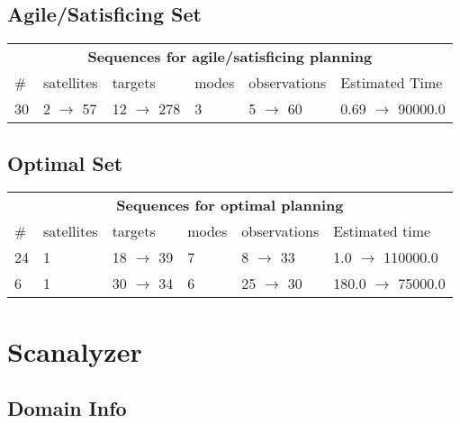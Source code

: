 \documentclass{article}
\begin{document}
                         \subsection*{Agile/Satisficing Set}

                        \begin{center}
                        \begin{tabular}{l|l|l|l|l|l}
                        \multicolumn{6}{c}{\bf \large Sequences for agile/satisficing planning}\\
                        \# & satellites & targets & modes & observations & Estimated Time\\\midrule
                        30&2 $\rightarrow$ 57&12 $\rightarrow$ 278&3&5 $\rightarrow$ 60&0.69 $\rightarrow$ 90000.0
                        \end{tabular}
                        \end{center}
                    
                            \subsection*{Optimal Set}

                            \begin{center}
                            \begin{tabular}{l|l|l|l|l|l}
                            \multicolumn{6}{c}{\bf \large Sequences for optimal planning}\\
                            \# & satellites & targets & modes & observations & Estimated time\\\midrule
                            24&1&18 $\rightarrow$ 39&7&8 $\rightarrow$ 33&1.0 $\rightarrow$ 110000.0\\
6&1&30 $\rightarrow$ 34&6&25 $\rightarrow$ 30&180.0 $\rightarrow$ 75000.0
                            \end{tabular}
                            \end{center}
                    \newpage \section{Scanalyzer}
                    \subsection*{Domain Info}
\end{document}
